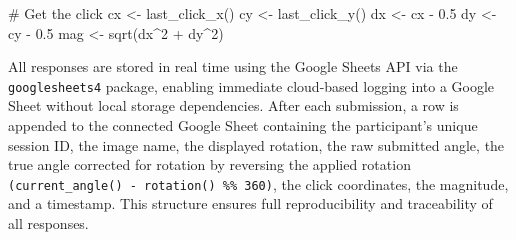 \documentclass[
]{article}
\newenvironment{Shaded}{\begin{snugshade}}{\end{snugshade}}
\newcommand{\CommentTok}[1]{\textcolor[rgb]{0.37,0.37,0.37}{#1}}
\newcommand{\DecValTok}[1]{\textcolor[rgb]{0.68,0.00,0.00}{#1}}
\newcommand{\FloatTok}[1]{\textcolor[rgb]{0.68,0.00,0.00}{#1}}
\newcommand{\FunctionTok}[1]{\textcolor[rgb]{0.28,0.35,0.67}{#1}}
\newcommand{\NormalTok}[1]{\textcolor[rgb]{0.00,0.23,0.31}{#1}}
\newcommand{\OtherTok}[1]{\textcolor[rgb]{0.00,0.23,0.31}{#1}}
\newcommand{\SpecialCharTok}[1]{\textcolor[rgb]{0.37,0.37,0.37}{#1}}
\begin{document}
\clearpage

\begin{Shaded}
\begin{Highlighting}[]
 \CommentTok{\# Get the click}
\NormalTok{    cx }\OtherTok{\textless{}{-}} \FunctionTok{last\_click\_x}\NormalTok{()}
\NormalTok{    cy }\OtherTok{\textless{}{-}} \FunctionTok{last\_click\_y}\NormalTok{()}
\NormalTok{    dx }\OtherTok{\textless{}{-}}\NormalTok{ cx }\SpecialCharTok{{-}} \FloatTok{0.5}
\NormalTok{    dy }\OtherTok{\textless{}{-}}\NormalTok{ cy }\SpecialCharTok{{-}} \FloatTok{0.5}
\NormalTok{    mag }\OtherTok{\textless{}{-}} \FunctionTok{sqrt}\NormalTok{(dx}\SpecialCharTok{\^{}}\DecValTok{2} \SpecialCharTok{+}\NormalTok{ dy}\SpecialCharTok{\^{}}\DecValTok{2}\NormalTok{)}
\end{Highlighting}
\end{Shaded}

All responses are stored in real time using the Google Sheets API via
the \texttt{googlesheets4} package, enabling immediate cloud-based
logging into a Google Sheet without local storage dependencies. After
each submission, a row is appended to the connected Google Sheet
containing the participant's unique session ID, the image name, the
displayed rotation, the raw submitted angle, the true angle corrected
for rotation by reversing the applied rotation
\texttt{(current\_angle()\ -\ rotation()\ \%\%\ 360)}, the click
coordinates, the magnitude, and a timestamp. This structure ensures full
reproducibility and traceability of all responses.
\end{document}
